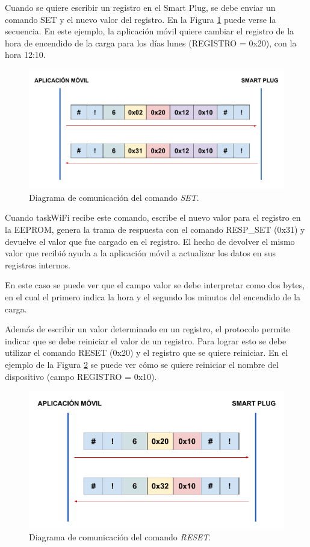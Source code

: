 Cuando se quiere escribir un registro en el Smart Plug, se debe enviar un comando SET y el nuevo valor del registro. En la Figura \ref{fig:comunicacion_set} puede verse la secuencia. En este ejemplo, la aplicación móvil quiere cambiar el registro de la hora de encendido de la carga para los días lunes (REGISTRO = 0x20), con la hora 12:10. 

\begin{figure}[h]
	\centering
	\includegraphics[width=14cm]{./Figures/3_2_5_comunicacion_SET.pdf}
	\caption{Diagrama de comunicación del comando \textit{SET}.}
	\label{fig:comunicacion_set}
\end{figure}

Cuando taskWiFi recibe este comando, escribe el nuevo valor para el registro en la EEPROM, genera la trama de respuesta con el comando RESP\_SET (0x31) y devuelve el valor que fue cargado en el registro. El hecho de devolver el mismo valor que recibió ayuda a la aplicación móvil a actualizar los datos en sus registros internos.

En este caso se puede ver que el campo valor se debe interpretar como dos bytes, en el cual el primero indica la hora y el segundo los minutos del encendido de la carga.

Además de escribir un valor determinado en un registro, el protocolo permite indicar que se debe reiniciar el valor de un registro. Para lograr esto se debe utilizar el comando RESET (0x20) y el registro que se quiere reiniciar. En el ejemplo de la Figura \ref{fig:comunicacion_reset} se puede ver cómo se quiere reiniciar el nombre del dispositivo (campo REGISTRO = 0x10).

\begin{figure}[h]
	\centering
	\includegraphics[width=14cm]{./Figures/3_2_5_comunicacion_RESET.pdf}
	\caption{Diagrama de comunicación del comando \textit{RESET}.}
	\label{fig:comunicacion_reset}
\end{figure}

